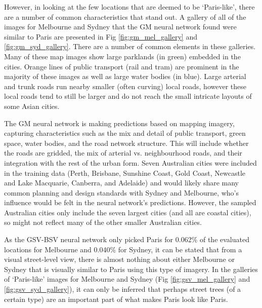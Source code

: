 \documentclass[10pt,letterpaper]{article}
\begin{document}
However, in looking at the few locations that are deemed to be `Paris-like', there are a number of common characteristics that stand out. A gallery of all of the images for Melbourne and Sydney that the GM neural network found were similar to Paris are presented in Fig \ref{fig:gm_mel_gallery} and \ref{fig:gm_syd_gallery}. There are a number of common elements in these galleries. Many of these map images show large parklands (in green) embedded in the cities. Orange lines of public transport (rail and tram) are prominent in the majority of these images as well as large water bodies (in blue). Large arterial and trunk roads run nearby smaller (often curving) local roads, however these local roads tend to still be larger and do not reach the small intricate layouts of some Asian cities.

The GM neural network is making predictions based on mapping imagery, capturing characteristics such as the mix and detail of public transport, green space, water bodies, and the road network structure. This will include whether the roads are gridded, the mix of arterial vs. neighbourhood roads, and their integration with the rest of the urban form. Seven Australian cities were included in the training data (Perth, Brisbane, Sunshine Coast, Gold Coast, Newcastle and Lake Macquarie, Canberra, and Adelaide) and would likely share many common planning and design standards with Sydney and Melbourne, who's influence would be felt in the neural network's predictions. However, the sampled Australian cities only include the seven largest cities (and all are coastal cities), so might not reflect many of the other smaller Australian cities. 




%
%
%

As the GSV-BSV neural network only picked Paris for 0.062\% of the evaluated locations for Melbourne and 0.040\% for Sydney, it can be stated that from a visual street-level view, there is almost nothing about either Melbourne or Sydney that is visually similar to Paris using this type of imagery. In the galleries of `Paris-like' images for Melbourne and Sydney (Fig \ref{fig:gsv_mel_gallery} and  \ref{fig:gsv_syd_gallery}), it can only be inferred that perhaps street trees (of a certain type) are an important part of what makes Paris look like Paris.
\end{document}
